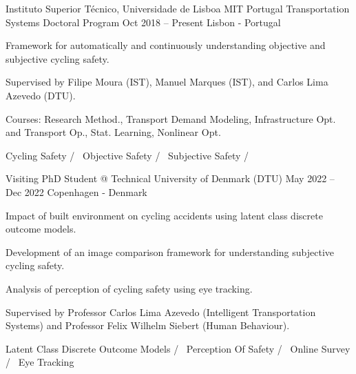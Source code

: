 

\begin{cventries}





  \cventry
    {Instituto Superior Técnico, Universidade de Lisboa} %
    {MIT Portugal Transportation Systems Doctoral Program} %
    {Oct 2018 – Present} %
    {Lisbon - Portugal} %
    {
      \begin{cvitems} %
        \item {Framework for automatically and continuously understanding objective and subjective cycling safety.}
        \item {Supervised by Filipe Moura (IST), Manuel Marques (IST), and Carlos Lima Azevedo (DTU).}
        \item {Courses: Research Method., Transport Demand Modeling, Infrastructure Opt. and Transport Op., Stat. Learning, Nonlinear Opt.}
      \end{cvitems}
    }
    {
      Cycling Safety /~
      Objective Safety /~
      Subjective Safety /~
    }

  \cventryinner
    {Visiting PhD Student @ Technical University of Denmark (DTU)} %
    {May 2022 – Dec 2022} %
    {Copenhagen - Denmark} %
    {
      \begin{cvitems} %
        \item {Impact of built environment on cycling accidents using latent class discrete outcome models.}
        \item {Development of an image comparison framework for understanding subjective cycling safety.}
        \item {Analysis of perception of cycling safety using eye tracking.}
        \item {Supervised by Professor Carlos Lima Azevedo (Intelligent Transportation Systems) and Professor Felix Wilhelm Siebert (Human Behaviour).}
      \end{cvitems}
    }
    {
      Latent Class Discrete Outcome Models /~
      Perception Of Safety /~
      Online Survey /~
      Eye Tracking
    }


\end{cventries}
